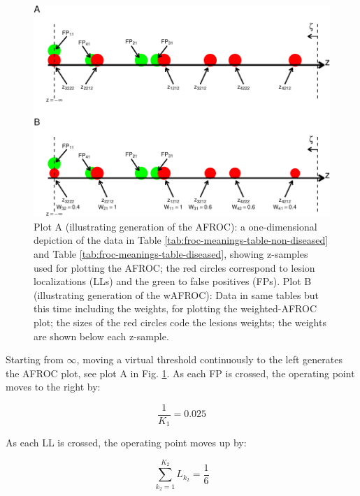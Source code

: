\documentclass[
]{book}
\begin{document}
\begin{figure}
\centering
\includegraphics{14-froc-meanings-foms-ocs_files/figure-latex/froc-meanings-linear-plot-afroc-wafroc-1.pdf}
\caption{\label{fig:froc-meanings-linear-plot-afroc-wafroc}Plot A (illustrating generation of the AFROC): a one-dimensional depiction of the data in Table \ref{tab:froc-meanings-table-non-diseased} and Table \ref{tab:froc-meanings-table-diseased}, showing z-samples used for plotting the AFROC; the red circles correspond to lesion localizations (LLs) and the green to false positives (FPs). Plot B (illustrating generation of the wAFROC): Data in same tables but this time including the weights, for plotting the weighted-AFROC plot; the sizes of the red circles code the lesions weights; the weights are shown below each z-sample.}
\end{figure}

Starting from \(\infty\), moving a virtual threshold continuously to the left generates the AFROC plot, see plot A in Fig. \ref{fig:froc-meanings-linear-plot-afroc-wafroc}. As each FP is crossed, the operating point moves to the right by:

\[\frac{1}{K_1} = 0.025\]

As each LL is crossed, the operating point moves up by:

\[\sum_{k_2=1}^{K_2}L_{k_2}=\frac{1}{6}\]
\end{document}
